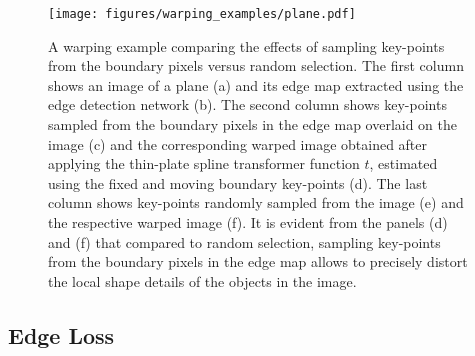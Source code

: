 \documentclass[final]{cvpr}
\newcommand\+{\mkern4mu}
\begin{document}
\begin{figure}[h]
	\centering
	\texttt{[image: figures/warping\_examples/plane.pdf]}
	\caption{A warping example comparing the effects of sampling key-points from the boundary pixels versus random selection. The first column shows an image of a plane (a) and its edge map extracted using the edge detection network (b). The second column shows key-points sampled from the boundary pixels in the edge map overlaid on the image (c) and the corresponding warped image obtained after applying the thin-plate spline transformer function $t$, estimated using the fixed and moving boundary key-points (d). The last column shows key-points randomly sampled from the image (e) and the respective warped image (f). It is evident from the panels (d) and (f) that compared to random selection, sampling key-points from the boundary pixels in the edge map allows to precisely distort the local shape details of the objects in the image.}
	\label{fig:plane}
	\vspace{-1em}
\end{figure} 
\subsection{Edge Loss}
\label{subsec:edge_loss}
\end{document}
